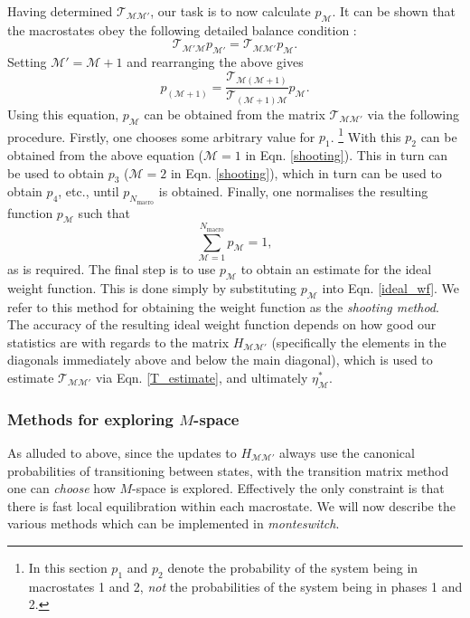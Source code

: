 \documentclass{report}
\begin{document}
Having determined  $\mathcal{T}_{\mathcal{MM}'}$, our task is to now calculate $p_{\mathcal{M}}$. It can be shown that the macrostates obey the following
detailed balance condition \cite{Smith_1995}:
\begin{equation}
\mathcal{T}_{\mathcal{M}'\mathcal{M}}p_{\mathcal{M}'}=\mathcal{T}_{\mathcal{MM}'}p_{\mathcal{M}}.
\end{equation}
Setting $\mathcal{M}'=\mathcal{M}+1$ and rearranging the above gives
\begin{equation}\label{shooting}
p_{(\mathcal{M}+1)}=\frac{\mathcal{T}_{\mathcal{M}(\mathcal{M}+1)}}{\mathcal{T}_{(\mathcal{M}+1)\mathcal{M}}}p_{\mathcal{M}}.
\end{equation}
Using this equation, $p_{\mathcal{M}}$ can be obtained from the matrix $\mathcal{T}_{\mathcal{M}\mathcal{M}'}$ via the following procedure.
Firstly, one chooses some arbitrary value for $p_1$. 
\footnote{In this section $p_1$ and $p_2$ denote the probability of the system being in macrostates 1 and 2, \emph{not} the probabilities of
the system being in phases 1 and 2.}
With this $p_2$ can be obtained from the above equation ($\mathcal{M}=1$ in Eqn. \eqref{shooting}). 
This in turn can be used to obtain $p_3$ ($\mathcal{M}=2$ in Eqn. \eqref{shooting}), which in turn can be used to obtain $p_4$, etc., until
$p_{N_{\text{macro}}}$ is obtained. Finally, one normalises the resulting function $p_{\mathcal{M}}$ such that
\begin{equation}
\sum_{\mathcal{M}=1}^{N_{\text{macro}}}p_{\mathcal{M}}=1,
\end{equation}
as is required. The final step is to use $p_{\mathcal{M}}$ to obtain an estimate for the ideal weight function. This is done simply by substituting 
$p_{\mathcal{M}}$ into Eqn. \eqref{ideal_wf}. We refer to this method for obtaining the weight function as the \emph{shooting method}.
The accuracy of the resulting ideal weight function depends on how good our statistics are with regards to
the matrix $H_{\mathcal{M}\mathcal{M}'}$ (specifically the elements in the diagonals immediately above and below the main diagonal), which is used to
estimate $\mathcal{T}_{\mathcal{M}\mathcal{M}'}$ via Eqn. \eqref{T_estimate}, and ultimately $\eta^*_{\mathcal{M}}$. 


\subsubsection{Methods for exploring $M$-space}
As alluded to above, since the updates to $H_{\mathcal{M}\mathcal{M}'}$ always use the canonical probabilities of transitioning between states, 
with the transition matrix method one can \emph{choose} how $M$-space is explored. Effectively the only constraint is that there is fast local 
equilibration within each macrostate. We will now describe the various methods which can be implemented in \emph{monteswitch}.
\end{document}
